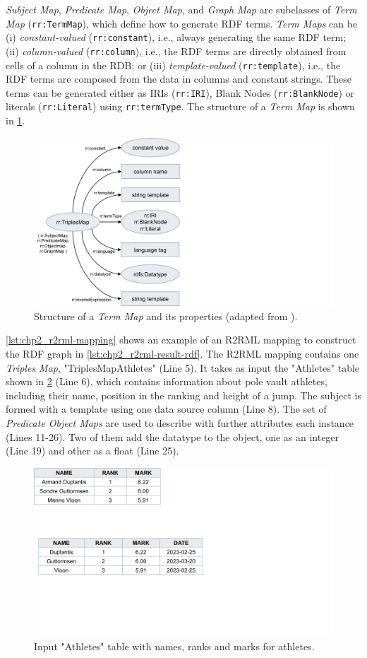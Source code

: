 \textit{Subject Map}, \textit{Predicate Map}, \textit{Object Map}, and \textit{Graph Map} are subclasses of \textit{Term Map} (\texttt{rr:TermMap}), which define how to generate RDF terms. 
\textit{Term Maps} can be (i) \textit{constant-valued} (\texttt{rr:constant}), i.e., always generating the same RDF term; 
(ii) \textit{column-valued} (\texttt{rr:column}), i.e., the RDF terms are directly obtained from cells of a column in the RDB; 
or (iii) \textit{template-valued} (\texttt{rr:template}), i.e., the RDF terms are composed from the data in columns and constant strings. These terms can be generated either as IRIs (\texttt{rr:IRI}), Blank Nodes (\texttt{rr:BlankNode}) or literals (\texttt{rr:Literal}) using \texttt{rr:termType}. The structure of a \textit{Term Map} is shown in \cref{fig:chp2_r2rml-term}.


\begin{figure}[t]
\centering
\includegraphics[width=0.45\linewidth]{figures/chp2_r2rml_term.pdf}
\caption[Structure of Term Map from R2RML]{Structure of a \textit{Term Map} and its properties (adapted from \cite{das2012r2rml}).}
\label{fig:chp2_r2rml-term}
\end{figure}



\cref{lst:chp2_r2rml-mapping} shows an example of an R2RML mapping to construct the RDF graph in \cref{lst:chp2_r2rml-result-rdf}. The R2RML mapping contains one \textit{Triples Map}, "TriplesMapAthletes" (Line 5). It takes as input the "Athletes" table shown in \cref{fig:chp2_database-example} (Line 6), which contains information about pole vault athletes, including their name, position in the ranking and height of a jump. The subject is formed with a template using one data source column (Line 8). The set of \textit{Predicate Object Maps} are used to describe with further attributes each instance (Lines 11-26). Two of them add the datatype to the object, one as an integer (Line 19) and other as a float (Line 25). 


\begin{figure}[h]
\centering
\includegraphics[width=0.45\linewidth]{figures/chp2_database-example.pdf}
\caption[Input "Athletes" table]{Input "Athletes" table with names, ranks and marks for athletes.}
\label{fig:chp2_database-example}
\end{figure}

